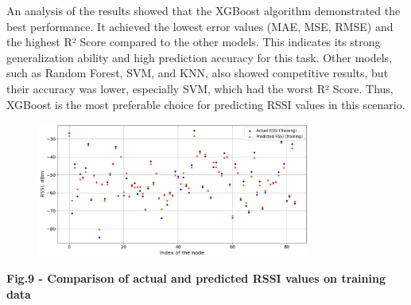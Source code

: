 
An analysis of the results showed that the XGBoost algorithm
demonstrated the best performance. It achieved the lowest error values
(MAE, MSE, RMSE) and the highest R² Score compared to the other models.
This indicates its strong generalization ability and high prediction
accuracy for this task. Other models, such as Random Forest, SVM, and
KNN, also showed competitive results, but their accuracy was lower,
especially SVM, which had the worst R² Score. Thus, XGBoost is the most
preferable choice for predicting RSSI values in this scenario.


\begin{figure}[H]
	\centering
	\includegraphics[width=0.8\textwidth]{media/ict/image49}
	\caption*{}
\end{figure}


{\bfseries Fig.9 - Comparison of actual and predicted RSSI values
\hspace{0pt}\hspace{0pt}on training data}


